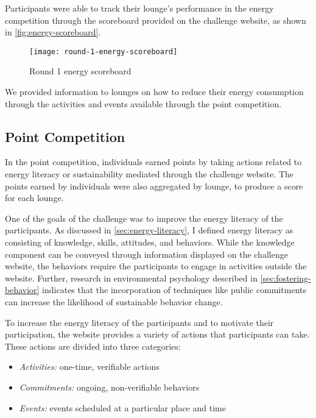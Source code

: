 Participants were able to track their lounge's performance in the energy competition through the scoreboard provided on the challenge website, as shown in \autoref{fig:energy-scoreboard}.

\begin{figure}[htbp]
	\centering
		\texttt{[image: round-1-energy-scoreboard]}
		\caption{Round 1 energy scoreboard}
\label{fig:energy-scoreboard}
\end{figure}

We provided information to lounges on how to reduce their energy consumption through the activities and events available through the point competition.


\subsection{Point Competition}
\label{sec:point-competition}

In the point competition, individuals earned points by taking actions related to energy literacy or sustainability mediated through the challenge website. The points earned by individuals were also aggregated by lounge, to produce a score for each lounge.

One of the goals of the challenge was to improve the energy literacy of the participants. As discussed in \autoref{sec:energy-literacy}, I defined energy literacy as consisting of knowledge, skills, attitudes, and behaviors. While the knowledge component can be conveyed through information displayed on the challenge website, the behaviors require the participants to engage in activities outside the website. Further, research in environmental psychology described in \autoref{sec:fostering-behavior} indicates that the incorporation of techniques like public commitments can increase the likelihood of sustainable behavior change.

To increase the energy literacy of the participants and to motivate their participation, the website provides a variety of actions that participants can take. These actions are divided into three categories:

\begin{itemize}
	\item \emph{Activities:} one-time, verifiable actions
	\item \emph{Commitments:} ongoing, non-verifiable behaviors
	\item \emph{Events:} events scheduled at a particular place and time
\end{itemize}

